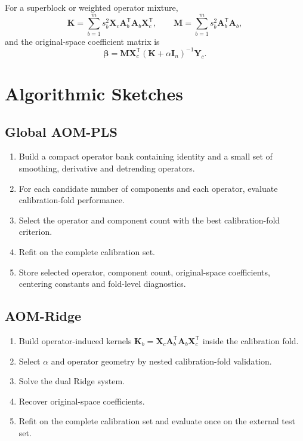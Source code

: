 \documentclass[11pt,a4paper]{article}
\newcommand{\X}{\mathbf{X}}
\newcommand{\Y}{\mathbf{Y}}
\newcommand{\A}{\mathbf{A}}
\newcommand{\K}{\mathbf{K}}
\newcommand{\transpose}{^{\mathsf T}}
\begin{document}
For a superblock or weighted operator mixture,
\begin{equation}
  \K = \sum_{b=1}^{m}s_b^2\X_c\A_b\transpose\A_b\X_c\transpose,
  \qquad
  \mathbf M = \sum_{b=1}^{m}s_b^2\A_b\transpose\A_b,
\end{equation}
and the original-space coefficient matrix is
\begin{equation}
  \bm\beta = \mathbf M\X_c\transpose(\K+\alpha\mathbf I_n)^{-1}\Y_c.
\end{equation}

\section{Algorithmic Sketches}

\subsection{Global AOM-PLS}

\begin{enumerate}
  \item Build a compact operator bank containing identity and a small set of
  smoothing, derivative and detrending operators.
  \item For each candidate number of components and each operator, evaluate
  calibration-fold performance.
  \item Select the operator and component count with the best calibration-fold
  criterion.
  \item Refit on the complete calibration set.
  \item Store selected operator, component count, original-space coefficients,
  centering constants and fold-level diagnostics.
\end{enumerate}

\subsection{AOM-Ridge}

\begin{enumerate}
  \item Build operator-induced kernels
  $\K_b=\X_c\A_b\transpose\A_b\X_c\transpose$ inside the calibration fold.
  \item Select $\alpha$ and operator geometry by nested calibration-fold
  validation.
  \item Solve the dual Ridge system.
  \item Recover original-space coefficients.
  \item Refit on the complete calibration set and evaluate once on the external
  test set.
\end{enumerate}
\end{document}
